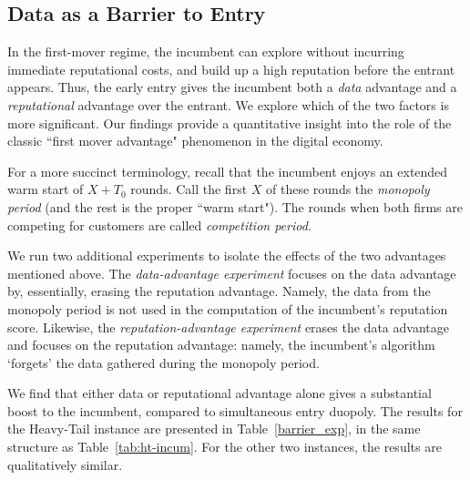 \documentclass[../competing_bandits_with_appendix.tex]{subfiles}
\begin{document}
\subsection{Data as a Barrier to Entry}\label{sec:barriers}



In the first-mover regime, the incumbent can explore without incurring immediate reputational costs, and build up a high reputation before the entrant appears. Thus, the early entry gives the incumbent both a \textit{data} advantage and a \textit{reputational} advantage over the entrant. We explore which of the two factors is more significant.  Our findings provide a quantitative insight into the role of the classic ``first mover advantage" phenomenon in the digital economy.


For a more succinct terminology, recall that the incumbent enjoys an extended warm start of $X+T_0$ rounds. Call the first $X$ of these rounds the \emph{monopoly period} (and the rest is the proper ``warm start"). The rounds when both firms are competing for customers are called \emph{competition period.}

We run two additional experiments to isolate the effects of the two
advantages mentioned above. The \emph{data-advantage experiment} focuses on the data advantage by, essentially, erasing the reputation advantage. Namely, the data from the monopoly period is not used in the computation of the incumbent's reputation score. Likewise, the \emph{reputation-advantage experiment} erases the data advantage and focuses on the reputation advantage: namely, the incumbent's algorithm `forgets' the data gathered during the monopoly period.

We find that either data or reputational advantage alone gives a substantial boost to the incumbent, compared to simultaneous entry duopoly. The results for the Heavy-Tail instance are presented in Table~\ref{barrier_exp}, in the same structure as Table~\ref{tab:ht-incum}. For the other two instances, the results are qualitatively similar.
\end{document}
